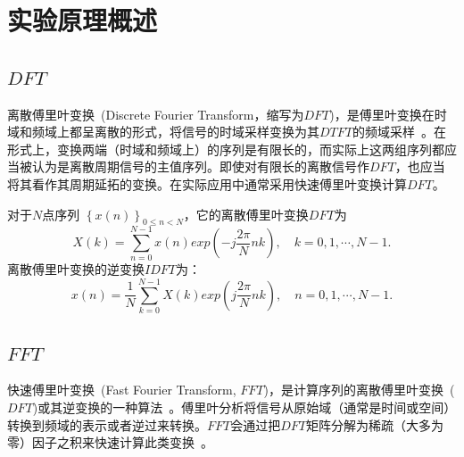 \documentclass[a4paper,11pt,onecolumn,twoside]{article}
\begin{document}

\section{实验原理概述}

\subsection{$DFT$}
离散傅里叶变换~(Discrete Fourier Transform，缩写为$DFT$)，是傅里叶变换在时域和频域上都呈离散的形式，将信号的时域采样变换为其$DTFT$的频域采样~\supercite{wiki}。在形式上，变换两端（时域和频域上）的序列是有限长的，而实际上这两组序列都应当被认为是离散周期信号的主值序列。即使对有限长的离散信号作$DFT$，也应当将其看作其周期延拓的变换。在实际应用中通常采用快速傅里叶变换计算$DFT$。

对于$N$点序列 $\left\{x(n)\right\}_{0\leq n<N}$，它的离散傅里叶变换$DFT$为
\begin{equation}
X(k) = \sum_{n=0}^{N-1} x(n) exp(-j\frac{2\pi}{N} nk), \quad k = 0,1,\cdots,N-1.
\end{equation}
离散傅里叶变换的逆变换$IDFT$为：
\begin{equation}
x(n) = \frac{1}{N} \sum_{k=0}^{N-1} X(k) exp(j\frac{2\pi}{N} nk), \quad n = 0,1,\cdots,N-1.
\end{equation}

\subsection{$FFT$}
快速傅里叶变换~(Fast Fourier Transform, $FFT$)，是计算序列的离散傅里叶变换~($DFT$)或其逆变换的一种算法~\supercite{wiki}。傅里叶分析将信号从原始域（通常是时间或空间）转换到频域的表示或者逆过来转换。$FFT$会通过把$DFT$矩阵分解为稀疏（大多为零）因子之积来快速计算此类变换~\supercite{wikifft}。
\end{document}
